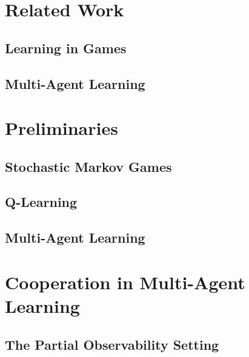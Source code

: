 \documentclass{article}
\begin{document}
\begin{multicols}{2}

\section{Related Work}

\subsection{Learning in Games}

\subsection{Multi-Agent Learning}


\section{Preliminaries}

\subsection{Stochastic Markov Games}

\subsection{Q-Learning}

\subsection{Multi-Agent Learning}


\section{Cooperation in Multi-Agent Learning}

\subsection{The Partial Observability Setting}


\end{multicols}
\end{document}
